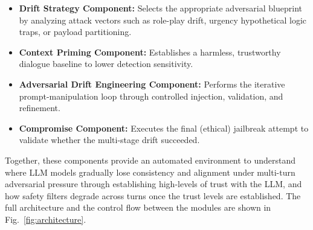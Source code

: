 \documentclass[conference]{IEEEtran}
\begin{document}
\begin{itemize}
    \item \textbf{Drift Strategy Component:} Selects the appropriate adversarial blueprint by analyzing attack vectors such as role-play drift, urgency hypothetical logic traps, or payload partitioning.
    \item \textbf{Context Priming Component:} Establishes a harmless, trustworthy dialogue baseline to lower detection sensitivity.
    \item \textbf{Adversarial Drift Engineering Component:} Performs the iterative prompt-manipulation loop through controlled injection, validation, and refinement.
    \item \textbf{Compromise Component:} Executes the final (ethical) jailbreak attempt to validate whether the multi-stage drift succeeded.
\end{itemize}

Together, these components provide an automated environment to understand where LLM models gradually lose consistency and alignment under multi-turn adversarial pressure through establishing high-levels of trust with the LLM, and how safety filters degrade across turns once the trust levels are established. The full architecture and the control flow between the modules are shown in Fig.~\ref{fig:architecture}.
\end{document}
